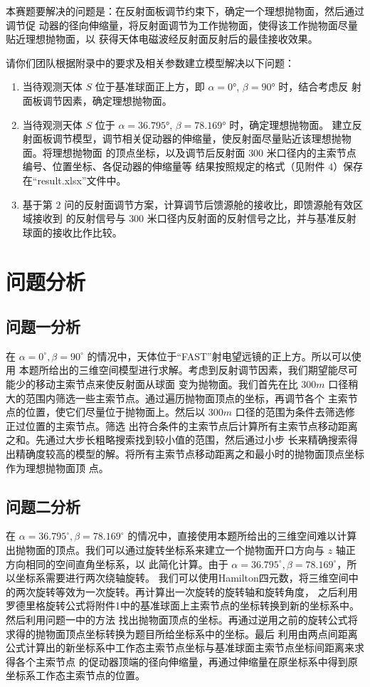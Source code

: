 \documentclass[withoutpreface,bwprint]{cumcmthesis} %
\begin{document}
本赛题要解决的问题是：在反射面板调节约束下，确定一个理想抛物面，然后通过调节促
动器的径向伸缩量，将反射面调节为工作抛物面，使得该工作抛物面尽量贴近理想抛物面，以
获得天体电磁波经反射面反射后的最佳接收效果。

请你们团队根据附录中的要求及相关参数建立模型解决以下问题：
\begin{enumerate}
    \item 当待观测天体 $𝑆$ 位于基准球面正上方，即 $\alpha = 0°$, $\beta = 90°$ 时，结合考虑反
          射面板调节因素，确定理想抛物面。
    \item 当待观测天体 $𝑆$ 位于 $\alpha = 36.795°$, $\beta = 78.169°$ 时，确定理想抛物面。
          建立反射面板调节模型，调节相关促动器的伸缩量，使反射面尽量贴近该理想抛物面。将理想抛物面
          的顶点坐标，以及调节后反射面 $300$ 米口径内的主索节点编号、位置坐标、各促动器的伸缩量等
          结果按照规定的格式（见附件 $4$）保存在“result.xlsx”文件中。
    \item 基于第 $2$ 问的反射面调节方案，计算调节后馈源舱的接收比，即馈源舱有效区域接收到
          的反射信号与 $300$ 米口径内反射面的反射信号之比，并与基准反射球面的接收比作比较。
\end{enumerate}

\section{问题分析}
\subsection{问题一分析}
在 $\alpha = 0^\circ , \beta = 90^\circ$ 的情况中，天体位于“FAST”射电望远镜的正上方。所以可以使用
本题所给出的三维空间模型进行求解。考虑到反射调节因素，我们期望能尽可能少的移动主索节点来使反射面从球面
变为抛物面。我们首先在比 $300m$ 口径稍大的范围内筛选一些主索节点。通过遍历抛物面顶点的坐标，再调节各个
主索节点的位置，使它们尽量位于抛物面上。然后以 $300m$ 口径的范围为条件去筛选修正过位置的主索节点。筛选
出符合条件的主索节点后计算所有主索节点移动距离之和。先通过大步长粗略搜索找到较小值的范围，然后通过小步
长来精确搜索得出精确度较高的模型的解。将所有主索节点移动距离之和最小时的抛物面顶点坐标作为理想抛物面顶
点。
\subsection{问题二分析}
在 $\alpha = 36.795^\circ , \beta = 78.169^\circ$ 的情况中，直接使用本题所给出的三维空间难以计算
出抛物面的顶点。我们可以通过旋转坐标系来建立一个抛物面开口方向与 $z$ 轴正方向相同的空间直角坐标系，以
此简化计算。由于 $\alpha = 36.795^\circ , \beta = 78.169^\circ$，所以坐标系需要进行两次绕轴旋转。
我们可以使用Hamilton四元数，将三维空间中的两次旋转等效为一次旋转。再计算出一次旋转的旋转轴和旋转角度，
之后利用罗德里格旋转公式将附件1中的基准球面上主索节点的坐标转换到新的坐标系中。然后利用问题一中的方法
找出抛物面顶点的坐标。再通过逆用之前的旋转公式将求得的抛物面顶点坐标转换为题目所给坐标系中的坐标。最后
利用由两点间距离公式计算出的新坐标系中工作态主索节点坐标与基准球面主索节点坐标间距离来求得各个主索节点
的促动器顶端的径向伸缩量，再通过伸缩量在原坐标系中得到原坐标系工作态主索节点的位置。
\end{document}
